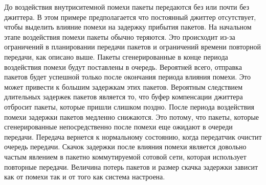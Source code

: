 До воздействия внутриситемной помехи пакеты передаются без или почти без джиттера. В этом примере предполагается что постоянный джиттер отсутствует, чтобы выделить влияние помехи на задержку прибытия пакетов.
На начальном этапе воздействия помехи пакеты обычно теряются. Это происходит из-за ограничений в планировании передачи пакетов и ограничений времени повторной передачи, как описано выше.
Пакеты сгенерированные в конце периода воздействия помехи будут поставлены в очередь. Вероятней всего, отправка пакетов будет успешной только после окончания периода влияния помехи. Это может привести к большим задержкам этих пакетов. Вероятным следствием длительных задержек пакетов является то, что буфер компенсации джиттера отбросит пакеты, которые пришли слишком поздно.
После периода воздействия помехи задержки пакетов медленно снижаются. Это потому, что пакеты, которые сгенерированные непосредственно после помехи еще ожидают в очереди передачи.
Передача вернется к нормальному состоянию, когда передатчик очистит очередь передачи.
Скачок задержки после влияния помехи является довольно частым явлением в пакетно коммутируемой сотовой сети, которая использует повторные передачи. Величина потерь пакетов и размер скачка задержки зависит как от помехи так и от того как система настроена.

